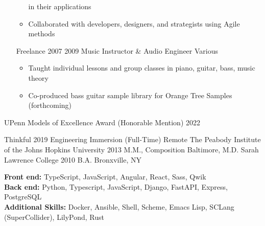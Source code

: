 \documentclass{article}
\begin{document}
\begin{itemize}[leftmargin=0em, label={}]
\begin{itemize}
            in their applications
          \item \small Collaborated with developers, designers, and strategists
            using Agile methods
        \end{itemize}
    \experience
        {Freelance}
        {2007}
        {2009}
        {Music Instructor \& Audio Engineer}
        {Various}
        \begin{itemize}
          \item \small Taught individual lessons and group classes in piano,
            guitar, bass, music theory
          \item \small Co-produced bass guitar sample library for Orange Tree
            Samples (forthcoming)
        \end{itemize}
\end{itemize}


\begin{itemize}[leftmargin=0em, label={}]
  \award
      {UPenn Models of Excellence Award (Honorable Mention)}
      {2022}
\end{itemize}


\begin{itemize}[leftmargin=0em, label={}]
    \education
        {Thinkful}
        {2019}
        {Engineering Immersion (Full-Time)}
        {Remote}
    \education
        {The Peabody Institute of the Johns Hopkins University}
        {2013}
        {M.M., Composition}
        {Baltimore, M.D.}
    \education
        {Sarah Lawrence College}
        {2010}
        {B.A.}
        {Bronxville, NY}
\end{itemize}


\textbf{Front end:} TypeScript, JavaScript, Angular, React, Sass, Qwik \\
\textbf{Back end:} Python, Typescript, JavaScript, Django, FastAPI, Express,
  PostgreSQL \\
\textbf{Additional Skills:} Docker, Ansible, Shell, Scheme, Emacs Lisp, SCLang
  (SuperCollider), LilyPond, Rust
\end{document}
